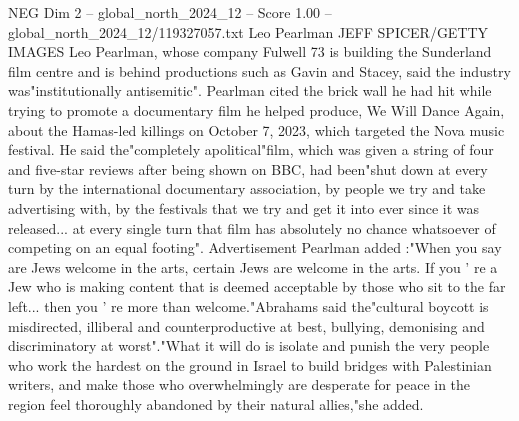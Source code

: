 \begin{textsample}{NEG Dim 2 – global\_north\_2024\_12 – Score 1.00 – global\_north\_2024\_12/119327057.txt}
Leo Pearlman JEFF SPICER/GETTY IMAGES Leo Pearlman, whose company Fulwell 73 is building the Sunderland film centre and is behind productions such as Gavin and Stacey, said the industry was"institutionally antisemitic".
Pearlman cited the brick wall he had hit while trying to promote a documentary film he helped produce, We Will Dance Again, about the Hamas-led killings on October 7, 2023, which targeted the Nova music festival.
He said the"completely apolitical"film, which was given a string of four and five-star reviews after being shown on BBC, had been"shut down at every turn by the international documentary association, by people we try and take advertising with, by the festivals that we try and get it into ever since it was released... at every single turn that film has absolutely no chance whatsoever of competing on an equal footing".
Advertisement Pearlman added :"When you say are Jews welcome in the arts, certain Jews are welcome in the arts.
If you ' re a Jew who is making content that is deemed acceptable by those who sit to the far left... then you ' re more than welcome."Abrahams said the"cultural boycott is misdirected, illiberal and counterproductive at best, bullying, demonising and discriminatory at worst"."What it will do is isolate and punish the very people who work the hardest on the ground in Israel to build bridges with Palestinian writers, and make those who overwhelmingly are desperate for peace in the region feel thoroughly abandoned by their natural allies,"she added.

\end{textsample}
